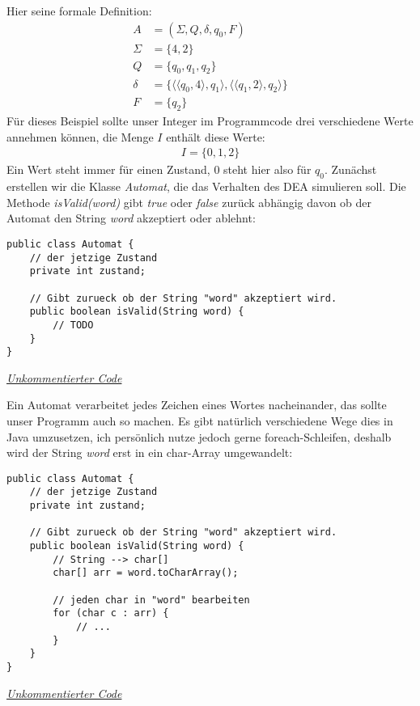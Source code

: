 \begin{flushleft}
    Hier seine formale Definition:
    \begin{align}
        A &= (\Sigma,Q,\delta,q_0,F) \\
        \Sigma &= \{4,2\} \\
        Q &= \{q_0,q_1,q_2\} \\
        \delta &= \{\langle \langle q_0, 4 \rangle, q_1 \rangle, \langle \langle q_1, 2 \rangle, q_2 \rangle \} \\
        F &= \{q_2\}
    \end{align}
    Für dieses Beispiel sollte unser Integer im Programmcode drei verschiedene Werte annehmen können,
    die Menge $I$ enthält diese Werte:
    \begin{align}
        I=\{0,1,2\}
    \end{align}
    Ein Wert steht immer für einen Zustand, $0$ steht hier also für $q_0$.
    Zunächst erstellen wir die Klasse \textit{Automat}, die das Verhalten des DEA simulieren soll.
    Die Methode \textit{isValid(word)} gibt \textit{true} oder \textit{false} zurück abhängig davon ob der Automat den String \textit{word} akzeptiert oder ablehnt:
\end{flushleft}

\begin{center}  
\begin{lstlisting}
public class Automat {
    // der jetzige Zustand
    private int zustand;

    // Gibt zurueck ob der String "word" akzeptiert wird.
    public boolean isValid(String word) {
        // TODO
    }
}
\end{lstlisting}
\href{https://raw.githubusercontent.com/tim-tm/articles/refs/heads/main/informatik-notes/code/Automat.java}{\textit{Unkommentierter Code}} \\
\end{center}

\begin{flushleft}
    Ein Automat verarbeitet jedes Zeichen eines Wortes nacheinander, das sollte unser Programm auch so machen.
    Es gibt natürlich verschiedene Wege dies in Java umzusetzen, ich persönlich nutze jedoch gerne foreach-Schleifen,
    deshalb wird der String \textit{word} erst in ein char-Array umgewandelt:
\end{flushleft}

\begin{center}
\begin{lstlisting}
public class Automat {
    // der jetzige Zustand
    private int zustand;

    // Gibt zurueck ob der String "word" akzeptiert wird.
    public boolean isValid(String word) {
        // String --> char[]
        char[] arr = word.toCharArray();

        // jeden char in "word" bearbeiten
        for (char c : arr) {
            // ...
        }
    }
}
\end{lstlisting}
\href{https://raw.githubusercontent.com/tim-tm/articles/refs/heads/main/informatik-notes/code/Automat.java}{\textit{Unkommentierter Code}} \\
\end{center}

